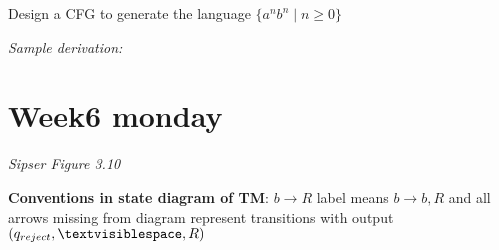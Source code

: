 \documentclass[12pt, oneside]{article}
\begin{document}
  \begin{comment}
    I moved the following to the review quiz.

    {\it Extra practice}: Is there a CFG $G$ with $L(G) = \emptyset$?


  Three different CFGs that each generate the  language $\{abba\}$
  
  \begin{align*}
  & ( \{ S, T, V, W\}, \{a,b\}, \{ S \to aT, T \to bV, V \to bW, W \to a\}, S)\\
  & \\ 
  & \\ 
  & \\ 
  & ( \{ Q \}, \{a,b\}, \{Q \to abba\}, Q) \\
  & \\ 
  & \\ 
  & \\
  & ( \{ X,Y \}, \{a,b\}, \{X \to aYa, Y \to bb\}, X) 
  & \\ 
  & \\ 
  \end{align*} 
\end{comment}
  \newpage
  Design a CFG to generate the  language $\{a^n b^n \mid  n  \geq  0\}$
  
  \vspace{100pt}
  
  {\it Sample derivation:} 
  
  \vspace{100pt}
  
  
  \vfill 


\newpage
 \vfill
\section*{Week6 monday}



{\it Sipser Figure  3.10}

{\bf Conventions in state diagram of TM}: $b \to R$ label means $b \to b, R$ and
all arrows missing from diagram represent transitions with output $(q_{reject}, \textvisiblespace , R)$
\end{document}
